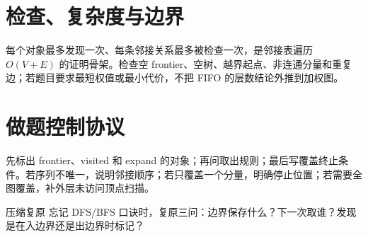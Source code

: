 \documentclass[UTF8,fontset=none,11pt,a4paper]{ctexart}
\begin{document}
\section{检查、复杂度与边界}
每个对象最多发现一次、每条邻接关系最多被检查一次，是邻接表遍历 $O(V+E)$ 的证明骨架。检查空 frontier、空树、越界起点、非连通分量和重复边；若题目要求最短权值或最小代价，不把 FIFO 的层数结论外推到加权图。

\section{做题控制协议}
先标出 frontier、visited 和 expand 的对象；再问取出规则；最后写覆盖终止条件。若序列不唯一，说明邻接顺序；若只覆盖一个分量，明确停止位置；若需要全图覆盖，补外层未访问顶点扫描。
\begin{corebox}{压缩复原}
忘记 DFS/BFS 口诀时，复原三问：边界保存什么？下一次取谁？发现是在入边界还是出边界时标记？
\end{corebox}
\end{document}
